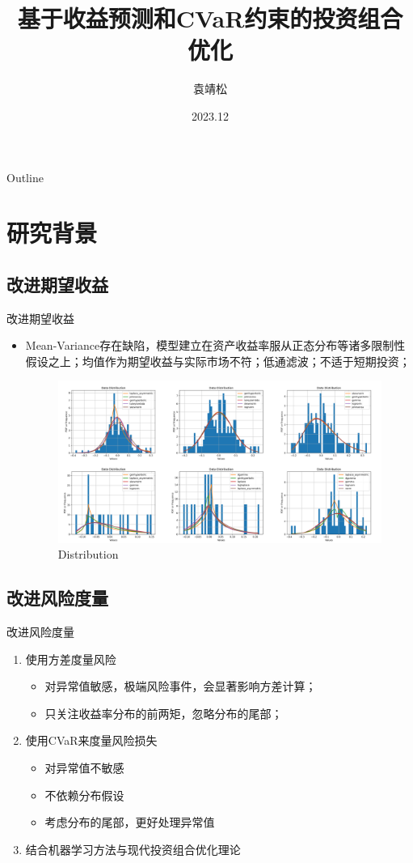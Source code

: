 \documentclass[CJK,aspectratio=43]{beamer}  %
\title[投资组合优化]{基于收益预测和CVaR约束的投资组合优化}
\author{袁靖松}
\institute{金融数学专题展示}
\date{2023.12}
\begin{document}
	\begin{frame}
		\titlepage
	\end{frame}
	\begin{frame}{Outline}
	\end{frame}
\section{研究背景}
\subsection{改进期望收益}
	\begin{frame}{改进期望收益}
			\begin{itemize}
				\item Mean-Variance存在缺陷，模型建立在资产收益率服从正态分布等诸多限制性假设之上；均值作为期望收益与实际市场不符；低通滤波；不适于短期投资；
			\begin{figure}
				\centering
				\includegraphics[width=1.04\linewidth]{"pic/distribution of random six"}
				\caption{Distribution}
				\label{fig:distribution-of-random-stock}
			\end{figure}
			\end{itemize}
	\end{frame}
\subsection{改进风险度量}
	\begin{frame}{改进风险度量}
		\begin{enumerate}
			\item 使用方差度量风险
			\begin{itemize}
				\item 对异常值敏感，极端风险事件，会显著影响方差计算；
				\item 只关注收益率分布的前两矩，忽略分布的尾部；
			\end{itemize}
			\item 使用CVaR来度量风险损失
			\begin{itemize}
				\item 对异常值不敏感
				\item 不依赖分布假设
				\item 考虑分布的尾部，更好处理异常值
			\end{itemize}
			\item 结合机器学习方法与现代投资组合优化理论~\cite{Ma2020}
		\end{enumerate}
	\end{frame}
\end{document}

